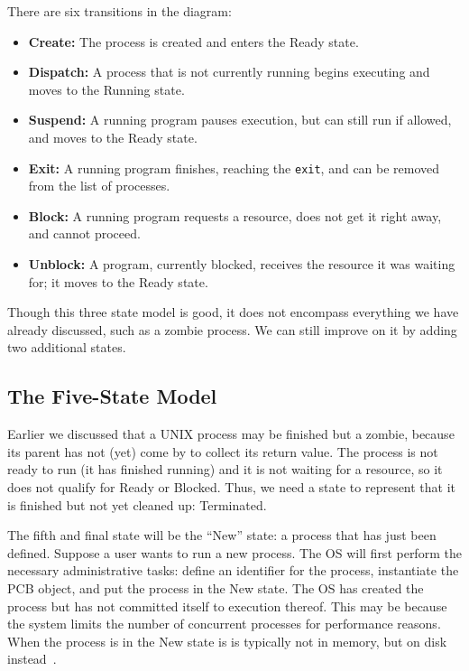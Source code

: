 There are six transitions in the diagram:
\begin{itemize}
	\item \textbf{Create:} The process is created and enters the Ready state.
	\item \textbf{Dispatch:} A process that is not currently running begins executing and moves to the Running state.
	\item \textbf{Suspend:} A running program pauses execution, but can still run if allowed, and moves to the Ready state.
	\item \textbf{Exit:} A running program finishes, reaching the \texttt{exit}, and can be removed from the list of processes.
	\item \textbf{Block:} A running program requests a resource, does not get it right away, and cannot proceed.
	\item \textbf{Unblock:} A program, currently blocked, receives the resource it was waiting for; it moves to the Ready state.
\end{itemize}


Though this three state model is good, it does not encompass everything we have already discussed, such as a zombie process. We can still improve on it by adding two additional states. 

\subsection*{The Five-State Model}

Earlier we discussed that a UNIX process may be finished but a zombie, because its parent has not (yet) come by to collect its return value. The process is not ready to run (it has finished running) and it is not waiting for a resource, so it does not qualify for Ready or Blocked. Thus, we need a state to represent that it is finished but not yet cleaned up: Terminated.

The fifth and final state will be the ``New'' state: a process that has just been defined. Suppose a user wants to run a new process. The OS will first perform the necessary administrative tasks: define an identifier for the process, instantiate the PCB object, and put the process in the New state. The OS has created the process but has not committed itself to execution thereof. This may be because the system limits the number of concurrent processes for performance reasons. When the process is in the New state is is typically not in memory, but on disk instead~\cite{osi}.

